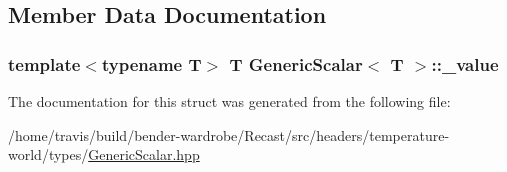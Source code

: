 \subsection{Member Data Documentation}
\hypertarget{struct_generic_scalar_a27d311e2bdb13149160fa258d46bcfe3}{
\subsubsection[{\-\_\-value}]{\setlength{\rightskip}{0pt plus 5cm}template$<$typename T$>$ T {\bf Generic\-Scalar}$<$ T $>$\-::\-\_\-value\hspace{0.3cm}{\ttfamily [protected]}}}\label{struct_generic_scalar_a27d311e2bdb13149160fa258d46bcfe3}


The documentation for this struct was generated from the following file\-:\begin{DoxyCompactItemize}
\item 
/home/travis/build/bender-\/wardrobe/\-Recast/src/headers/temperature-\/world/types/\hyperlink{_generic_scalar_8hpp}{Generic\-Scalar.\-hpp}\end{DoxyCompactItemize}
